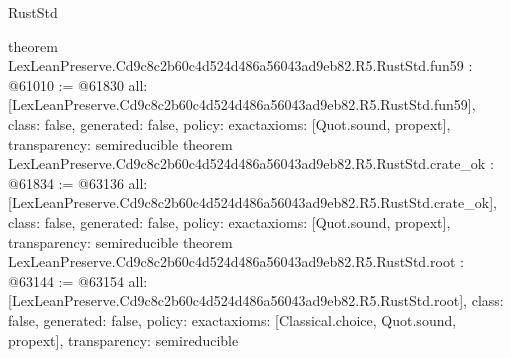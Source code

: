 \begin{lexlean}{RustStd}
\begin{coremodule}
{}
theorem LexLeanPreserve.Cd9c8c2b60c4d524d486a56043ad9eb82.R5.RustStd.fun59 : @61010 := @61830 {
  all: [LexLeanPreserve.Cd9c8c2b60c4d524d486a56043ad9eb82.R5.RustStd.fun59],
  class: false,
  generated: false,
  policy: exact{axioms: [Quot.sound, propext]},
  transparency: semireducible
}
theorem LexLeanPreserve.Cd9c8c2b60c4d524d486a56043ad9eb82.R5.RustStd.crate_ok : @61834 := @63136 {
  all: [LexLeanPreserve.Cd9c8c2b60c4d524d486a56043ad9eb82.R5.RustStd.crate_ok],
  class: false,
  generated: false,
  policy: exact{axioms: [Quot.sound, propext]},
  transparency: semireducible
}
theorem LexLeanPreserve.Cd9c8c2b60c4d524d486a56043ad9eb82.R5.RustStd.root : @63144 := @63154 {
  all: [LexLeanPreserve.Cd9c8c2b60c4d524d486a56043ad9eb82.R5.RustStd.root],
  class: false,
  generated: false,
  policy: exact{axioms: [Classical.choice, Quot.sound, propext]},
  transparency: semireducible
}


\end{coremodule}
\end{lexlean}
